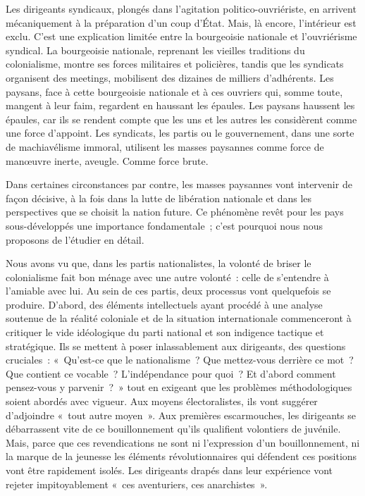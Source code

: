 \documentclass[french,twoside]{book} %
\begin{document}
Les dirigeants syndicaux, plongés dans l’agitation politico-ouvriériste, en arrivent mécaniquement à la préparation d’un coup d’État. Mais, là encore, l’intérieur est exclu. C’est une explication limitée entre la bourgeoisie nationale et l’ouvriérisme syndical. La bourgeoisie nationale, reprenant les vieilles traditions du colonialisme, montre ses forces militaires et policières, tandis que les syndicats organisent des meetings, mobilisent des dizaines de milliers d’adhérents. Les paysans, face à cette bourgeoisie nationale et à ces ouvriers qui, somme toute, mangent à leur faim, regardent en haussant les épaules. Les paysans haussent les épaules, car ils se rendent compte que les uns et les autres les considèrent comme une force d’appoint. Les syndicats, les partis ou le gouvernement, dans une sorte de machiavélisme immoral, utilisent les masses paysannes comme force de manœuvre inerte, aveugle. Comme force brute.\par
 Dans certaines circonstances par contre, les masses paysannes vont intervenir de façon décisive, à la fois dans la lutte de libération nationale et dans les perspectives que se choisit la nation future. Ce phénomène revêt pour les pays sous-développés une importance fondamentale ; c’est pourquoi nous nous proposons de l’étudier en détail.\par
Nous avons vu que, dans les partis nationalistes, la volonté de briser le colonialisme fait bon ménage avec une autre volonté : celle de s’entendre à l’amiable avec lui. Au sein de ces partis, deux processus vont quelquefois se produire. D’abord, des éléments intellectuels ayant procédé à une analyse soutenue de la réalité coloniale et de la situation internationale commenceront à critiquer le vide idéologique du parti national et son indigence tactique et stratégique. Ils se mettent à poser inlassablement aux dirigeants, des questions cruciales : « Qu’est-ce que le nationalisme ? Que mettez-vous derrière ce mot ? Que contient ce vocable ? L’indépendance pour quoi ? Et d’abord comment pensez-vous y parvenir ? » tout en exigeant que les problèmes méthodologiques soient abordés avec vigueur. Aux moyens électoralistes, ils vont suggérer d’adjoindre « tout autre moyen ». Aux premières escarmouches, les dirigeants se débarrassent vite de ce bouillonnement qu’ils qualifient volontiers de juvénile. Mais, parce que ces revendications ne sont ni l’expression d’un bouillonnement, ni la marque de la jeunesse les éléments révolutionnaires qui défendent ces positions vont être rapidement isolés. Les dirigeants drapés dans leur expérience vont rejeter impitoyablement « ces aventuriers, ces anarchistes ».\par
\end{document}
